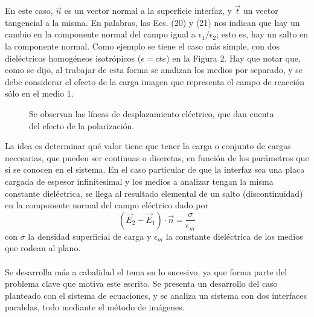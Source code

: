 \documentclass[12pt, notitlepage]{article}
\begin{document}
En este caso, $\vec{n}$ es un vector normal a la superficie interfaz, y $\vec{t}$ un vector tangencial a la misma. En palabras, las Ecs. (20) y (21) nos indican que hay un cambio en la componente normal del campo igual a $\epsilon_1/\epsilon_2$; esto es, hay un salto en la componente normal. Como ejemplo se tiene el caso más simple, con dos dieléctricos homogéneos isotrópicos ($\epsilon = cte$) en la Figura 2. Hay que notar que, como se dijo, al trabajar de esta forma se analizan los medios por separado, y se debe considerar el efecto de la carga imagen que representa el campo de reacción sólo en el medio 1.
\begin{figure}[H]
\vspace{2cm}
\centering

\caption{Se observan las líneas de desplazamiento eléctrico, que dan cuenta del efecto de la polarización.}
\end{figure}
\noindent
La idea es determinar qué valor tiene que tener la carga o conjunto de cargas necesarias, que pueden ser continuas o discretas, en función de los parámetros que si se conocen en el sistema. En el caso particular de que la interfaz sea una placa cargada de espesor infinitesimal y los medios a analizar tengan la misma constante dieléctrica, se llega al resultado elemental de un salto (discontinuidad) en la componente normal del campo eléctrico dado por
\begin{equation}
(\vec{E}_2 - \vec{E}_1)\cdot\vec{n} = \frac{\sigma}{\epsilon_m}
\end{equation}
con $\sigma$ la densidad superficial de carga y $\epsilon_m$ la constante dieléctrica de los medios que rodean al plano. \\\\
Se desarrolla más a cabalidad el tema en lo sucesivo, ya que forma parte del problema clave que motiva este escrito. Se presenta un desarrollo del caso planteado con el sistema de ecuaciones, y se analiza un sistema con dos interfaces paralelas, todo mediante el método de imágenes. 
\end{document}
